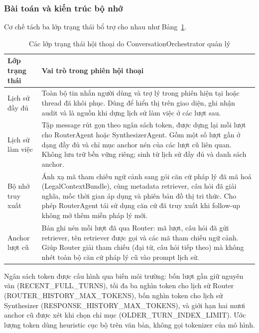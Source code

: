 \documentclass[../DoAn.tex]{subfiles}
\begin{document}
\subsubsection{Bài toán và kiến trúc bộ nhớ}

Cơ chế tách ba lớp trạng thái bổ trợ cho nhau như Bảng~\ref{tab:conversation_state_layers}.

\begin{table}[H]
\centering
\footnotesize
\renewcommand{\arraystretch}{1.08}
\begin{tabularx}{\textwidth}{|>{\raggedright\arraybackslash}p{3.6cm}|>{\raggedright\arraybackslash}X|}
\hline
\textbf{Lớp trạng thái} & \textbf{Vai trò trong phiên hội thoại} \\ \hline
Lịch sử đầy đủ &
Toàn bộ tin nhắn người dùng và trợ lý trong phiên hiện tại hoặc thread đã khôi phục. Dùng để hiển thị trên giao diện, ghi nhận audit và là nguồn khi dựng lịch sử làm việc ở các lượt sau. \\ \hline
Lịch sử làm việc &
Tập message rút gọn theo ngân sách token, được dựng lại mỗi lượt cho RouterAgent hoặc SynthesizerAgent. Gồm một số lượt gần ở dạng đầy đủ và chỉ mục anchor nén của các lượt cũ liên quan. Không lưu trữ bền vững riêng; sinh từ lịch sử đầy đủ và danh sách anchor. \\ \hline
Bộ nhớ truy xuất &
Ánh xạ mã tham chiếu ngữ cảnh sang gói căn cứ pháp lý đã mã hoá (LegalContextBundle), cùng metadata retriever, câu hỏi đã giải nghĩa, mốc thời gian áp dụng và phiên bản đồ thị tri thức. Cho phép RouterAgent tái sử dụng căn cứ đã truy xuất khi follow-up không mở thêm miền pháp lý mới. \\ \hline
Anchor lượt cũ &
Bản ghi nén mỗi lượt đã qua Router: mã lượt, câu hỏi đã gửi retriever, tên retriever được gọi và các mã tham chiếu ngữ cảnh. Giúp Router giải tham chiếu (đại từ, câu hỏi tiếp theo) mà không nhét toàn bộ căn cứ pháp lý cũ vào prompt lịch sử. \\ \hline
\end{tabularx}
\caption{Các lớp trạng thái hội thoại do ConversationOrchestrator quản lý}
\label{tab:conversation_state_layers}
\end{table}

Ngân sách token được cấu hình qua biến môi trường: bốn lượt gần giữ nguyên văn (RECENT\_\allowbreak FULL\_\allowbreak TURNS), tối đa ba nghìn token cho lịch sử Router (ROUTER\_\allowbreak HISTORY\_\allowbreak MAX\_\allowbreak TOKENS), bốn nghìn token cho lịch sử Synthesizer (RESPONSE\_\allowbreak HISTORY\_\allowbreak MAX\_\allowbreak TOKENS), và giới hạn hai mươi anchor cũ được xét khi chọn chỉ mục (OLDER\_\allowbreak TURN\_\allowbreak INDEX\_\allowbreak LIMIT). Ước lượng token dùng heuristic cục bộ trên văn bản, không gọi tokenizer của mô hình.
\end{document}
